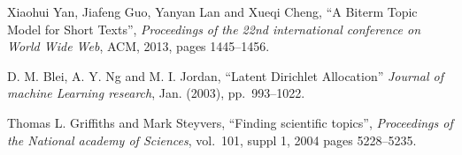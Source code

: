 \documentclass[final]{ieee}
\begin{document}
           



\begin{thebibliography}{99}
   Xiaohui Yan, Jiafeng Guo, Yanyan Lan and Xueqi Cheng, 
   ``A Biterm Topic Model for Short Texts'', {\it Proceedings of the 22nd international conference on 
   World Wide Web}, ACM, 2013, pages 1445--1456.

   D. M. Blei, A. Y. Ng and M. I. Jordan, ``Latent Dirichlet Allocation'' {\it Journal of machine Learning research},  Jan. (2003), pp.~993--1022.
   
    Thomas L. Griffiths and Mark Steyvers, 
   ``Finding scientific topics'', {\it Proceedings of the National academy of Sciences}, vol.~101, suppl 1, 2004 pages 5228--5235.


  
    
  
  




\end{thebibliography}
\end{document}
